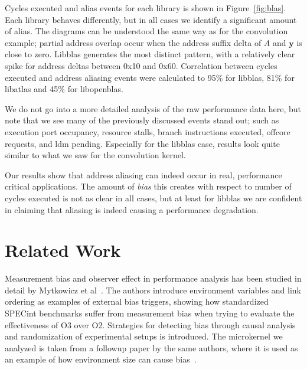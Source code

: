 \documentclass{acm_proc_article-sp}
\begin{document}
Cycles executed and alias events for each library is shown in Figure~\ref{fig:blas}.
Each library behaves differently, but in all cases we identify a significant amount of alias. 
The diagrams can be understood the same way as for the convolution example; partial address overlap occur when the address suffix delta of $A$ and $\boldsymbol{y}$ is close to zero.
Libblas generates the most distinct pattern, with a relatively clear spike for address deltas between 0x10 and 0x60.
Correlation between cycles executed and address aliasing events were calculated to 95\% for libblas, 81\% for libatlas and 45\% for libopenblas.

We do not go into a more detailed analysis of the raw performance data here, but note that we see many of the previously discussed events stand out; such as execution port occupancy, resource stalls, branch instructions executed, offcore requests, and ldm pending.
Especially for the libblas case, results look quite similar to what we saw for the convolution kernel.

Our results show that address aliasing can indeed occur in real, performance critical applications.
The amount of \emph{bias} this creates with respect to number of cycles executed is not as clear in all cases, but at least for libblas we are confident in claiming that aliasing is indeed causing a performance degradation.


\section{Related Work}
\label{sec:related}
Measurement bias and observer effect in performance analysis has been studied in detail by Mytkowicz et al~.
The authors introduce environment variables and link ordering as examples of external bias triggers, showing how standardized {\small SPECint} benchmarks suffer from measurement bias when trying to evaluate the effectiveness of O3 over O2. 
Strategies for detecting bias through causal analysis and randomization of experimental setups is introduced.
The microkernel we analyzed is taken from a followup paper by the same authors, where it is used as an example of how environment size can cause bias~\cite{Mytkowicz:2009:WrongData}.
\end{document}
